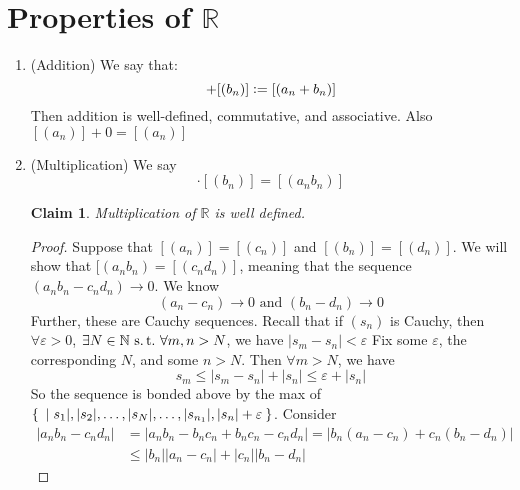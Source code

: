 \documentclass[12pt]{amsart}
\newcommand{\bbR}{\mathbb{R}}
\newcommand{\bbN}{\mathbb{N}}
\newcommand{\suchthat}{\operatorname{\thinspace s.t. \thinspace}}
\theoremstyle{plain}
\newtheorem*{claim}{Claim}
\theoremstyle{remark}
\theoremstyle{definition}
\begin{document}
\par
\section*{Properties of $\bbR$}

\begin{enumerate}[(1)]
	\item (Addition)
		We say that: 
		\begin{equation*}
			[(a_n)] + [(b_n)] \vcentcolon = [(a_n+b_n)]
		\end{equation*}
		Then addition is well-defined, commutative, and associative. Also $[(a_n)] + 0 = [(a_n)]$
	\item (Multiplication)
		We say 
		\begin{equation*}
			[(a_n)]\cdot[(b_n)] = [(a_nb_n)]
		\end{equation*}
		\begin{claim}
			Multiplication of $\bbR$ is well defined.
		\end{claim}
		\begin{proof}
			Suppose that $[(a_n)] = [(c_n)]$ and $[(b_n)] = [(d_n)]$. We will show that $[(a_nb_n) = [(c_nd_n)]$, meaning that the sequence $(a_nb_n - c_nd_n) \rightarrow 0$.
			\newline
			We know 
			\begin{equation*}
				(a_n - c_n) \rightarrow 0 \mbox{ and } (b_n - d_n) \rightarrow 0
			\end{equation*}
			Further, these are Cauchy sequences. Recall that if $(s_n)$ is Cauchy, then $\forall \varepsilon > 0$, $\exists N \in\bbN \suchthat \forall m,n > N$, we have $|s_m - s_n| < \varepsilon$
			\newline
			Fix some $\varepsilon$, the corresponding $N$, and some $n > N$. Then $\forall m > N$, we have
			\begin{equation*}
			s_m \leqslant |s_m - s_n| + |s_n| \leqslant \varepsilon + |s_n|
			\end{equation*}
			So the sequence is bonded above by the max of $\Set{|s_1|, |s_2|, \dots,|s_N|,\dots,|s_{n_1}|,|s_n| + \varepsilon}$.
			Consider 
			\begin{equation*}
			\begin{split}
			|a_n b_n - c_n d_n| &= |a_n b_n - b_n c_n + b_n c_n - c_n d_n| = |b_n(a_n - c_n) + c_n(b_n - d_n)|\\
		&\leqslant |b_n||a_n - c_n| + |c_n||b_n - d_n|
			\end{split}
			\end{equation*}

\end{proof}
\end{enumerate}
\end{document}
